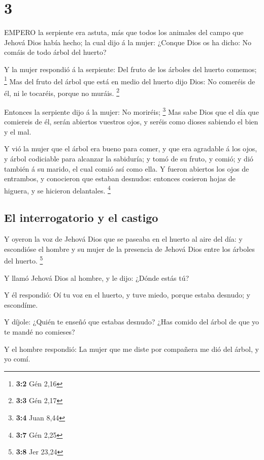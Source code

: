 \hypertarget{section-2}{%
\section{3}\label{section-2}}

 EMPERO la serpiente era astuta, más que todos los animales
del campo que Jehová Dios había hecho; la cual dijo á la mujer: ¿Conque
Dios os ha dicho: No comáis de todo árbol del huerto?

 Y la mujer respondió á la serpiente: Del fruto de los
árboles del huerto comemos; \footnote{\textbf{3:2} Gén 2,16}
 Mas del fruto del árbol que está en medio del huerto dijo
Dios: No comeréis de él, ni le tocaréis, porque no muráis. \footnote{\textbf{3:3}
  Gén 2,17}

 Entonces la serpiente dijo á la mujer: No moriréis;
\footnote{\textbf{3:4} Juan 8,44}  Mas sabe Dios que el día
que comiereis de él, serán abiertos vuestros ojos, y seréis como dioses
sabiendo el bien y el mal.

 Y vió la mujer que el árbol era bueno para comer, y que era
agradable á los ojos, y árbol codiciable para alcanzar la sabiduría; y
tomó de su fruto, y comió; y dió también á su marido, el cual comió así
como ella.  Y fueron abiertos los ojos de entrambos, y
conocieron que estaban desnudos: entonces cosieron hojas de higuera, y
se hicieron delantales. \footnote{\textbf{3:7} Gén 2,25}

\hypertarget{el-interrogatorio-y-el-castigo}{%
\subsection{El interrogatorio y el
castigo}\label{el-interrogatorio-y-el-castigo}}

 Y oyeron la voz de Jehová Dios que se paseaba en el huerto
al aire del día: y escondióse el hombre y su mujer de la presencia de
Jehová Dios entre los árboles del huerto. \footnote{\textbf{3:8} Jer
  23,24}

 Y llamó Jehová Dios al hombre, y le dijo: ¿Dónde estás tú?

 Y él respondió: Oí tu voz en el huerto, y tuve miedo,
porque estaba desnudo; y escondíme.

 Y díjole: ¿Quién te enseñó que estabas desnudo? ¿Has
comido del árbol de que yo te mandé no comieses?

 Y el hombre respondió: La mujer que me diste por compañera
me dió del árbol, y yo comí.

